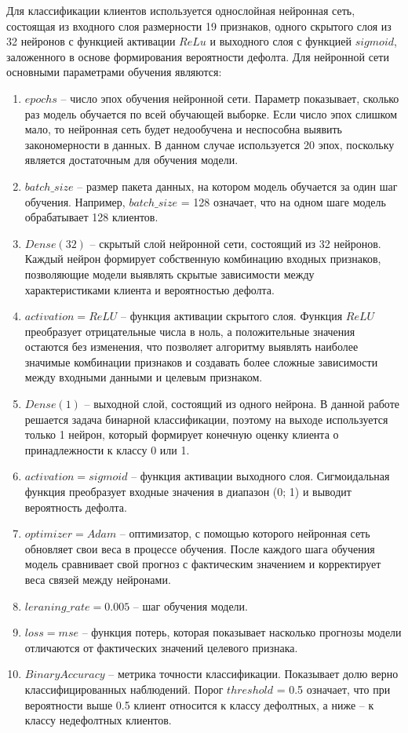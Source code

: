 Для классификации клиентов используется однослойная нейронная сеть, состоящая из входного слоя размерности 19 признаков, одного скрытого слоя из 32 нейронов с функцией активации $ReLu$ и выходного слоя с функцией $sigmoid$, заложенного в основе формирования вероятности дефолта. Для нейронной сети основными параметрами обучения являются:
\begin{enumerate}[nosep]
	\item $epochs$ -- число эпох обучения нейронной сети. Параметр показывает, сколько раз модель обучается по всей обучающей выборке. Если число эпох слишком мало, то нейронная сеть будет недообучена и неспособна выявить закономерности в данных. В данном случае используется 20 эпох, поскольку является достаточным для обучения модели.
	\item $batch\_size$ -- размер пакета данных, на котором модель обучается за один шаг обучения. Например, $batch\_size$ = 128 означает, что на одном шаге модель обрабатывает 128 клиентов. 
	\item $Dense(32)$ -- скрытый слой нейронной сети, состоящий из 32 нейронов. Каждый нейрон формирует собственную комбинацию входных признаков, позволяющие модели выявлять скрытые зависимости между характеристиками клиента и вероятностью дефолта.
	\item $activation = ReLU$ -- функция активации скрытого слоя. Функция $ReLU$ преобразует отрицательные числа в ноль, а положительные значения остаются без изменения, что позволяет алгоритму выявлять наиболее значимые комбинации признаков и создавать более сложные зависимости между входными данными и целевым признаком.
	\item $Dense(1)$ -- выходной слой, состоящий из одного нейрона. В данной работе решается задача бинарной классификации, поэтому на выходе используется только 1 нейрон, который формирует конечную оценку клиента о принадлежности к классу 0 или 1.
	\item $activation = sigmoid$ -- функция активации выходного слоя. Сигмоидальная функция преобразует входные значения в диапазон (0; 1) и выводит вероятность дефолта.
	\item $optimizer = Adam$ -- оптимизатор, с помощью которого нейронная сеть обновляет свои веса в процессе обучения. После каждого шага обучения модель сравнивает свой прогноз с фактическим значением и корректирует веса связей между нейронами. 
	\item $leraning\_rate = 0.005$ -- шаг обучения модели. 
	\item $loss = mse$ -- функция потерь, которая показывает насколько прогнозы модели отличаются от фактических значений целевого признака. 
	\item $BinaryAccuracy$ -- метрика точности классификации. Показывает долю верно классифицированных наблюдений. Порог $threshold$ = 0.5 означает, что при вероятности выше 0.5 клиент относится к классу дефолтных, а ниже -- к классу недефолтных клиентов. 
\end{enumerate}

